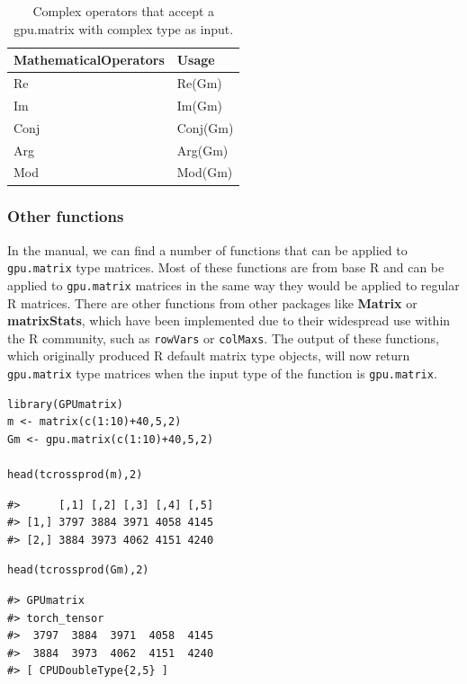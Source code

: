 \begin{table}

\caption{\label{tab:complex-operators}Complex operators that accept a gpu.matrix with complex type as input.}
\centering
\begin{tabular}[t]{l|l}
\hline
MathematicalOperators & Usage\\
\hline
Re & Re(Gm)\\
\hline
Im & Im(Gm)\\
\hline
Conj & Conj(Gm)\\
\hline
Arg & Arg(Gm)\\
\hline
Mod & Mod(Gm)\\
\hline
\end{tabular}
\end{table}

\hypertarget{other-functions}{%
\subsubsection{Other functions}\label{other-functions}}

In the manual, we can find a number of functions that can be applied to \texttt{gpu.matrix} type matrices. Most of these functions are from base R and can be applied to \texttt{gpu.matrix} matrices in the same way they would be applied to regular R matrices. There are other functions from other packages like \textbf{Matrix} or \textbf{matrixStats}, which have been implemented due to their widespread use within the R community, such as \texttt{rowVars} or \texttt{colMaxs}. The output of these functions, which originally produced R default matrix type objects, will now return \texttt{gpu.matrix} type matrices when the input type of the function is \texttt{gpu.matrix}.

\begin{verbatim}
library(GPUmatrix)
m <- matrix(c(1:10)+40,5,2)
Gm <- gpu.matrix(c(1:10)+40,5,2)

head(tcrossprod(m),2)
\end{verbatim}

\begin{verbatim}
#>      [,1] [,2] [,3] [,4] [,5]
#> [1,] 3797 3884 3971 4058 4145
#> [2,] 3884 3973 4062 4151 4240
\end{verbatim}

\begin{verbatim}
head(tcrossprod(Gm),2)
\end{verbatim}

\begin{verbatim}
#> GPUmatrix
#> torch_tensor
#>  3797  3884  3971  4058  4145
#>  3884  3973  4062  4151  4240
#> [ CPUDoubleType{2,5} ]
\end{verbatim}

